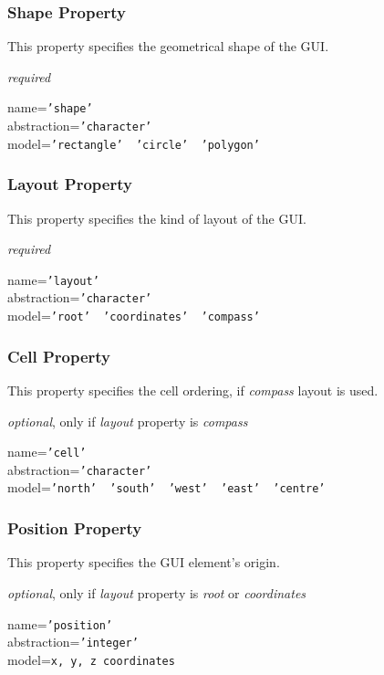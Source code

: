 \subsubsection{Shape Property}

This property specifies the geometrical shape of the GUI.

\emph{required}

name=\texttt{'shape'}\\
abstraction=\texttt{'character'}\\
model=\texttt{'rectangle' \vline\ 'circle' \vline\ 'polygon'}

\subsubsection{Layout Property}

This property specifies the kind of layout of the GUI.

\emph{required}

name=\texttt{'layout'}\\
abstraction=\texttt{'character'}\\
model=\texttt{'root' \vline\ 'coordinates' \vline\ 'compass'}

\subsubsection{Cell Property}

This property specifies the cell ordering, if \emph{compass} layout is used.

\emph{optional}, only if \emph{layout} property is \emph{compass}

name=\texttt{'cell'}\\
abstraction=\texttt{'character'}\\
model=\texttt{'north' \vline\ 'south' \vline\ 'west' \vline\ 'east' \vline\ 'centre'}

\subsubsection{Position Property}

This property specifies the GUI element's origin.

\emph{optional}, only if \emph{layout} property is \emph{root} or \emph{coordinates}

name=\texttt{'position'}\\
abstraction=\texttt{'integer'}\\
model=\texttt{x, y, z coordinates}

